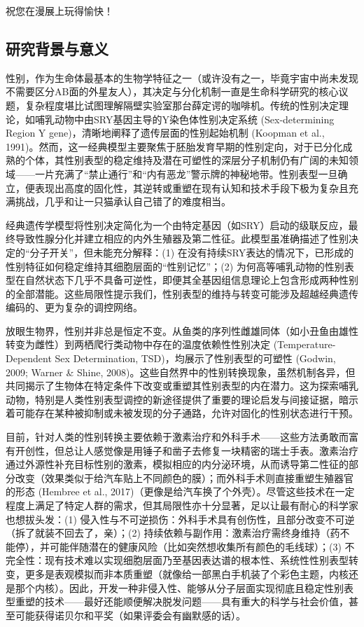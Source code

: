 祝您在漫展上玩得愉快！

\subsection{研究背景与意义}

性别，作为生命体最基本的生物学特征之一（或许没有之一，毕竟宇宙中尚未发现不需要区分AB面的外星友人），其决定与分化机制一直是生命科学研究的核心议题，复杂程度堪比试图理解隔壁实验室那台薛定谔的咖啡机。传统的性别决定理论，如哺乳动物中由SRY基因主导的Y染色体性别决定系统 (Sex-determining Region Y gene)，清晰地阐释了遗传层面的性别起始机制 (Koopman et al., 1991)。然而，这一经典模型主要聚焦于胚胎发育早期的性别定向，对于已分化成熟的个体，其性别表型的稳定维持及潜在可塑性的深层分子机制仍有广阔的未知领域——一片充满了“禁止通行”和“内有恶龙”警示牌的神秘地带。性别表型一旦确立，便表现出高度的固化性，其逆转或重塑在现有认知和技术手段下极为复杂且充满挑战，几乎和让一只猫承认自己错了的难度相当。

经典遗传学模型将性别决定简化为一个由特定基因（如SRY）启动的级联反应，最终导致性腺分化并建立相应的内外生殖器及第二性征。此模型虽准确描述了性别决定的“分子开关”，但未能充分解释：(1) 在没有持续SRY表达的情况下，已形成的性别特征如何稳定维持其细胞层面的“性别记忆”；(2) 为何高等哺乳动物的性别表型在自然状态下几乎不具备可逆性，即便其全基因组信息理论上包含形成两种性别的全部潜能。这些局限性提示我们，性别表型的维持与转变可能涉及超越经典遗传编码的、更为复杂的调控网络。

放眼生物界，性别并非总是恒定不变。从鱼类的序列性雌雄同体（如小丑鱼由雄性转变为雌性）到两栖爬行类动物中存在的温度依赖性性别决定 (Temperature-Dependent Sex Determination, TSD)，均展示了性别表型的可塑性 (Godwin, 2009; Warner \& Shine, 2008)。这些自然界中的性别转换现象，虽然机制各异，但共同揭示了生物体在特定条件下改变或重塑其性别表型的内在潜力。这为探索哺乳动物，特别是人类性别表型调控的新途径提供了重要的理论启发与间接证据，暗示着可能存在某种被抑制或未被发现的分子通路，允许对固化的性别状态进行干预。

目前，针对人类的性别转换主要依赖于激素治疗和外科手术——这些方法勇敢而富有开创性，但总让人感觉像是用锤子和凿子去修复一块精密的瑞士手表。激素治疗通过外源性补充目标性别的激素，模拟相应的内分泌环境，从而诱导第二性征的部分改变（效果类似于给汽车贴上不同颜色的膜）；而外科手术则直接重塑生殖器官的形态 (Hembree et al., 2017)（更像是给汽车换了个外壳）。尽管这些技术在一定程度上满足了特定人群的需求，但其局限性亦十分显著，足以让最有耐心的科学家也想拔头发：(1) 侵入性与不可逆损伤：外科手术具有创伤性，且部分改变不可逆（拆了就装不回去了，亲）；(2) 持续依赖与副作用：激素治疗需终身维持（药不能停），并可能伴随潜在的健康风险（比如突然想收集所有颜色的毛线球）；(3) 不完全性：现有技术难以实现细胞层面乃至基因表达谱的根本性、系统性性别表型转变，更多是表观模拟而非本质重塑（就像给一部黑白手机装了个彩色主题，内核还是那个内核）。因此，开发一种非侵入性、能够从分子层面实现彻底且稳定性别表型重塑的技术——最好还能顺便解决脱发问题——具有重大的科学与社会价值，甚至可能获得诺贝尔和平奖（如果评委会有幽默感的话）。

